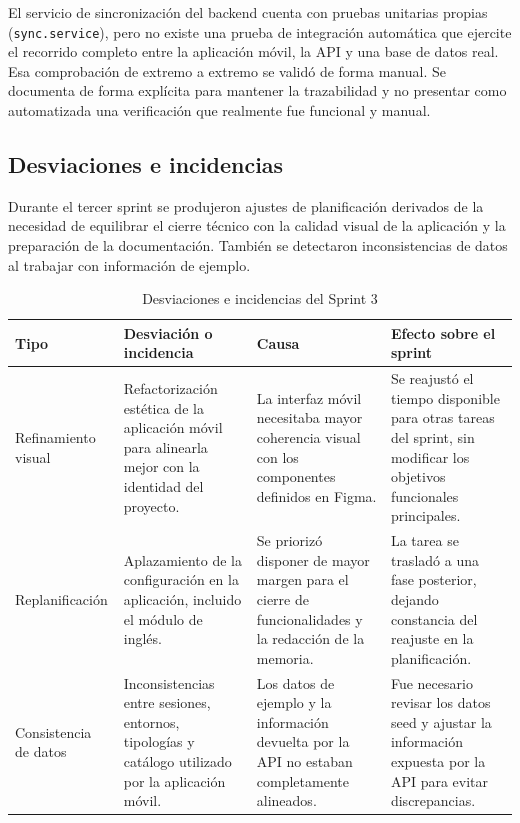 El servicio de sincronización del backend cuenta con pruebas unitarias propias (\texttt{sync.service}), pero no existe una prueba de integración automática que ejercite el recorrido completo entre la aplicación móvil, la API y una base de datos real. Esa comprobación de extremo a extremo se validó de forma manual. Se documenta de forma explícita para mantener la trazabilidad y no presentar como automatizada una verificación que realmente fue funcional y manual.

\subsection{Desviaciones e incidencias}

Durante el tercer sprint se produjeron ajustes de planificación derivados de la
necesidad de equilibrar el cierre técnico con la calidad visual de la aplicación
y la preparación de la documentación. También se detectaron inconsistencias de
datos al trabajar con información de ejemplo.

\begin{table}[H]
\centering
\caption{Desviaciones e incidencias del Sprint 3}
\label{tab:desviaciones_sprint3}
\small
\setlength{\tabcolsep}{4pt}
\renewcommand{\arraystretch}{1.22}
\begin{tabularx}{\textwidth}{|>{\raggedright\arraybackslash}p{2.6cm}|>{\raggedright\arraybackslash}X|>{\raggedright\arraybackslash}X|>{\raggedright\arraybackslash}X|}
\hline
\textbf{Tipo} & \textbf{Desviación o incidencia} & \textbf{Causa} & \textbf{Efecto sobre el sprint} \\
\hline
Refinamiento visual & Refactorización estética de la aplicación móvil para alinearla mejor con la identidad del proyecto. & La interfaz móvil necesitaba mayor coherencia visual con los componentes definidos en Figma. & Se reajustó el tiempo disponible para otras tareas del sprint, sin modificar los objetivos funcionales principales. \\
\hline
Replanificación & Aplazamiento de la configuración en la aplicación, incluido el módulo de inglés. & Se priorizó disponer de mayor margen para el cierre de funcionalidades y la redacción de la memoria. & La tarea se trasladó a una fase posterior, dejando constancia del reajuste en la planificación. \\
\hline
Consistencia de datos & Inconsistencias entre sesiones, entornos, tipologías y catálogo utilizado por la aplicación móvil. & Los datos de ejemplo y la información devuelta por la API no estaban completamente alineados. & Fue necesario revisar los datos seed y ajustar la información expuesta por la API para evitar discrepancias. \\
\hline
\end{tabularx}
\end{table}

